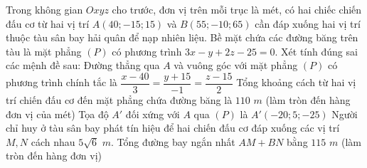 \begin{ex}
	Trong không gian $Oxyz$ cho trước, đơn vị trên mỗi trục là mét, có hai chiếc chiến đấu cơ từ hai vị trí $A(40;-15;15)$ và $B(55;-10;65)$ cần đáp xuống hai vị trí thuộc tàu sân bay hải quân để nạp nhiên liệu. Bề mặt chứa các đường băng trên tàu là mặt phẳng $(P)$ có phương trình $3x - y + 2z - 25 = 0$. Xét tính đúng sai các mệnh đề sau:
	\choiceTF
	{\True Đường thẳng qua $A$ và vuông góc với mặt phẳng $(P)$ có phương trình chính tắc là $\dfrac{x - 40}{3} = \dfrac{y + 15}{-1} = \dfrac{z - 15}{2}$}
	{ Tổng khoảng cách từ hai vị trí chiến đấu cơ đến mặt phẳng chứa đường băng là $110$ $m$ (làm tròn đến hàng đơn vị của mét)}
	{\True Tọa độ $A'$ đối xứng với $A$ qua $(P)$ là $A'(-20; 5; -25)$}
	{ Người chỉ huy ở tàu sân bay phát tín hiệu để hai chiến đấu cơ đáp xuống các vị trí $M, N$ cách nhau $5\sqrt{6}$ $m$. Tổng đường bay ngắn nhất $AM + BN$ bằng $115$ $m$ (làm tròn đến hàng đơn vị)}
\end{ex}

